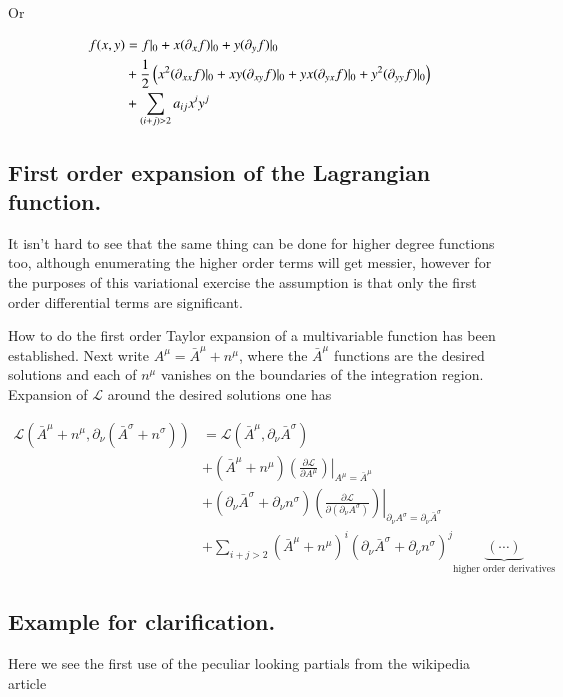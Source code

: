 \documentclass{article}
\newcommand{\LL}[0]{\mathcal{L}}
\newcommand{\PD}[2]{\frac{\partial {#2}}{\partial {#1}}}
\newcommand{\barA}[0]{\bar{A}}
\begin{document}
Or

\begin{align*}
f(x,y) &= f \vert_0 + x (\partial_x f) \vert_0 + y (\partial_y f) \vert_0 \\
&+ \frac{1}{2} \left( x^2 (\partial_{x x} f) \vert_0 + x y (\partial_{x y} f) \vert_0  + y x (\partial_{y x} f) \vert_0  + y^2(\partial_{y y} f) \vert_0 \right) \\
&+ \sum_{(i+j) > 2} a_{i j} x^i y^j
\end{align*}

\subsection{ First order expansion of the Lagrangian function. }

It isn't hard to see that the same thing can be done for higher degree functions too, although enumerating the 
higher order terms will get messier, however for the purposes of this variational exercise the assumption is that only
the first order differential terms are significant.

How to do the first order Taylor expansion of a multivariable function has been established.  Next write $A^\mu = \barA^\mu + n^\mu$, where the $\barA^\mu$ functions are the desired solutions and each of $n^\mu$ vanishes on the boundaries of the integration region.  Expansion of $\LL$ around the desired solutions one has

\begin{align*}
\LL(\barA^\mu + n^\mu, \partial_\nu( \barA^\sigma + n^\sigma) )
&=
\LL(\barA^\mu, \partial_\nu \barA^\sigma ) \\
&+ (\barA^\mu + n^\mu) \left( \left. \PD{A^\mu}{\LL} \right) \right\vert_{A^\mu = \barA^\mu} \\
&+ (\partial_\nu \barA^\sigma + \partial_\nu n^\sigma) \left( \left. \PD{(\partial_\nu A^\sigma)}{\LL} \right) \right\vert_{\partial_\nu A^\sigma = \partial_\nu \barA^\sigma} \\
&+ \sum_{i+j>2} (\barA^\mu + n^\mu)^i (\partial_\nu \barA^\sigma + \partial_\nu n^\sigma)^j \underbrace{\left(\cdots\right)}_{\text{higher order derivatives}}
\end{align*}

\subsection{ Example for clarification. }
Here we see the first use of the peculiar looking partials from the wikipedia article
\end{document}
